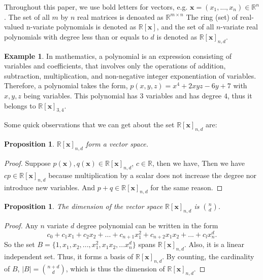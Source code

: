 \documentclass[12pt]{amsart}
\numberwithin{equation}{section}
\newtheorem{prop}[thm]{Proposition}
\theoremstyle{definition}
\newtheorem{example}[thm]{Example}
\numberwithin{thm}{section}
\begin{document}
Throughout this paper, we use bold letters for vectors, e.g. $\mathbf{x} = (x_1, ..., x_n) \in \mathbb{R}^n$.
The set of all $m$ by $n$ real matrices is denoated as $\mathbb{R}^{m \times n}$ 
The ring (set) of real-valued n-variate polynomials is denoted as $\mathbb{R}[\mathbf{x}]$, 
and the set of all $n$-variate real polynomials with degree less than or equals to $d$ is denoted as $\mathbb{R}[\mathbf{x}]_{n, d}$.

\begin{example}
     In mathematics, a polynomial is an expression consisting of variables and coefficients, that involves only the operations of addition, subtraction, multiplication, and non-negative integer exponentiation of variables.
     Therefore, a polynomial takes the form, 
     $p(x, y, z) = x^4 + 2xyz - 6y + 7$ with $x, y, z$ being variables. This polynomial has $3$ variables and has degree $4$, thus it 
     belongs to $\mathbb{R}[\mathbf{x}]_{3, 4}$.
\end{example}

Some quick observations that we can get about the set $\mathbb{R}[\mathbf{x}]_{n, d}$ are:
\begin{prop}
     \label{prop:vs}
     $\mathbb{R}[\mathbf{x}]_{n, d}$ form a vector space.
\end{prop}
    
\begin{proof}
     Suppose $p(\mathbf{x}), q(\mathbf{x}) \in \mathbb{R}[\mathbf{x}]_{n, d}$, $c \in \mathbb{R}$, then we have,
     Then we have $cp \in \mathbb{R}[\mathbf{x}]_{n, d}$ because multiplication by a scalar does not increase the degree nor introduce new variables.
     And $p + q \in \mathbb{R}[\mathbf{x}]_{n, d}$ for the same reason. 

\end{proof}

\begin{prop}
     The dimension of the vector space $\mathbb{R}[\mathbf{x}]_{n, d}$ is ${n \choose d}$.
\end{prop}

\begin{proof}
     Any $n$ variate $d$ degree polynomial can be written in the form 
     \begin{equation*}c_0 + c_1 x_1 + c_2 x_2 + ... + c_{n+1} x_1^2 + c_{n+2} x_1 x_2 + ... + c_l x_n^d.
     \end{equation*}
     So the set $B = \{1, x_1, x_2, ..., x_1^2, x_1 x_2, ... x_n^d\}$ spans $\mathbb{R}[\mathbf{x}]_{n, d}$.
     Also, it is a linear independent set. Thus, it forms a basis of $\mathbb{R}[\mathbf{x}]_{n, d}$.
     By counting, the cardinality of $B$, $|B| = {n+d \choose d}$, which is thus the dimension of $\mathbb{R}[\mathbf{x}]_{n, d}$.
\end{proof}
\end{document}
